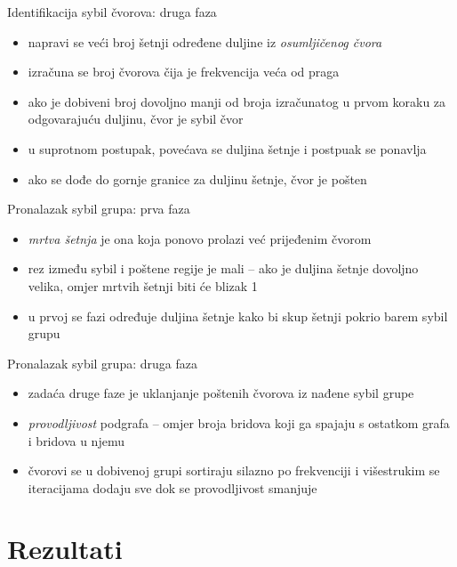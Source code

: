 \documentclass{beamer}
\begin{document}
\begin{frame}{Identifikacija sybil čvorova: druga faza}
  \begin{itemize}
    \item napravi se veći broj šetnji određene duljine iz \textit{osumljičenog čvora}
    \item izračuna se broj čvorova čija je frekvencija veća od praga
    \item ako je dobiveni broj dovoljno manji od broja izračunatog u prvom koraku za odgovarajuću duljinu, čvor je sybil čvor
    \item u suprotnom postupak, povećava se duljina šetnje i postpuak se ponavlja
    \item ako se dođe do gornje granice za duljinu šetnje, čvor je pošten
  \end{itemize}
\end{frame}

\begin{frame}{Pronalazak sybil grupa: prva faza}
  \begin{itemize}
    \item \textit{mrtva šetnja} je ona koja ponovo prolazi već prijeđenim čvorom
    \item rez između sybil i poštene regije je mali -- ako je duljina šetnje dovoljno velika, omjer mrtvih šetnji biti će blizak 1
    \item u prvoj se fazi određuje duljina šetnje kako bi skup šetnji pokrio barem sybil grupu
  \end{itemize}
\end{frame}

\begin{frame}{Pronalazak sybil grupa: druga faza}
  \begin{itemize}
    \item zadaća druge faze je uklanjanje poštenih čvorova iz nađene sybil grupe
    \item \textit{provodljivost} podgrafa -- omjer broja bridova koji ga spajaju s ostatkom grafa i bridova u njemu
    \item čvorovi se u dobivenoj grupi sortiraju silazno po frekvenciji i višestrukim se iteracijama dodaju sve dok se provodljivost smanjuje
  \end{itemize}
\end{frame}

\section{Rezultati}
\end{document}
